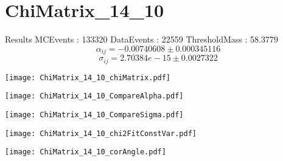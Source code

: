 \documentclass[a4paper,12pt]{article}
\begin{document}
\section{ChiMatrix\_14\_10}
\begin{minipage}{0.49\linewidth} Results \newline
MCEvents : 133320\newline
DataEvents : 22559 \newline
ThresholdMass : 58.3779\\
$$\alpha_{ij} = -0.00740608\pm 0.000345116$$
$$\sigma_{ij} = 2.70384e-15\pm 0.0027322$$
\end{minipage}\hfill
\begin{minipage}{0.49\linewidth} 
\texttt{[image: ChiMatrix\_14\_10\_chiMatrix.pdf]}\\
\end{minipage}
\hfill
\begin{minipage}{0.49\linewidth} 
\texttt{[image: ChiMatrix\_14\_10\_CompareAlpha.pdf]}\\
\end{minipage}
\hfill
\begin{minipage}{0.49\linewidth} 
\texttt{[image: ChiMatrix\_14\_10\_CompareSigma.pdf]}\\
\end{minipage}
\begin{minipage}{0.49\linewidth} 
\texttt{[image: ChiMatrix\_14\_10\_chi2FitConstVar.pdf]}\\
\end{minipage}
\hfill
\begin{minipage}{0.49\linewidth} 
\texttt{[image: ChiMatrix\_14\_10\_corAngle.pdf]}\\
\end{minipage}
\end{document}
